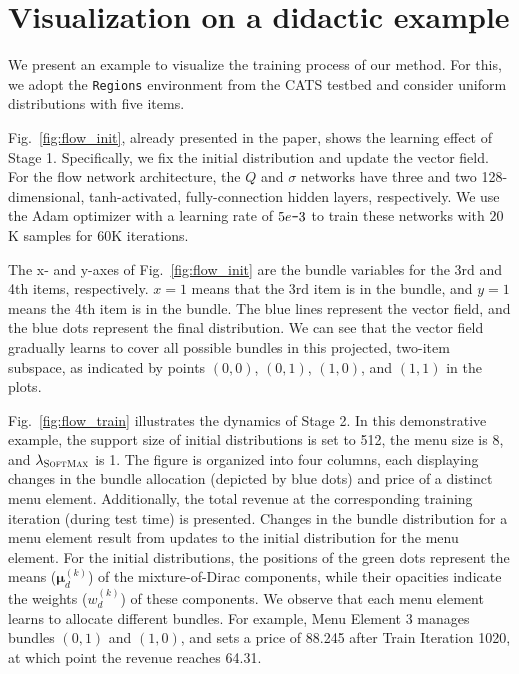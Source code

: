 \section{Visualization on a didactic example}\label{sec:viz}

We present an example to visualize the training process of our method. For this, we adopt the \texttt{Regions} environment from the CATS testbed and consider uniform distributions with five items. 

Fig.~\ref{fig:flow_init}, already presented in the paper, shows the learning effect of Stage 1. Specifically, we fix the initial distribution and update the vector field. For the flow network architecture, the $Q$ and $\sigma$ networks have three and two 128-dimensional, tanh-activated, fully-connection hidden layers, respectively. We use the Adam optimizer with a learning rate of $5e\textup{\texttt{-}} 3$ to train these networks with $20$K samples for $60$K iterations.

The x- and y-axes of Fig.~\ref{fig:flow_init} are the bundle variables for the 3rd and 4th items, respectively. $x=1$ means that the 3rd item is in the bundle, and $y=1$ means the 4th item is in the bundle. The blue lines represent the vector field, and the blue dots represent the final distribution. We can see that the vector field gradually learns to cover all possible bundles in this projected, two-item subspace, 
as indicated by points $(0,0)$, $(0,1)$, $(1,0)$, and $(1,1)$ in the plots.

Fig.~\ref{fig:flow_train} illustrates the dynamics of Stage 2. In this demonstrative example, the support size of initial distributions is set to 512, the menu size is 8, and $\lambda_{\textsc{SoftMax}}$ is 1. The figure is organized into four columns, each displaying changes in the bundle allocation (depicted by blue dots) and  price of a distinct menu element. Additionally, the total revenue at the corresponding training iteration (during test time) is  presented. Changes in the bundle distribution for a menu element result from updates to the initial distribution for the menu element. For the initial distributions, the positions of the green dots represent the means ($\bm\mu_d^{(k)}$) of the mixture-of-Dirac components, while their opacities indicate the weights ($w_d^{(k)}$) of these components. We observe that each menu element learns to allocate different bundles. For example, Menu Element 3 manages bundles $(0,1)$ and $(1,0)$, and sets a price of 88.245 after Train Iteration 1020, at which point the revenue reaches 64.31.

